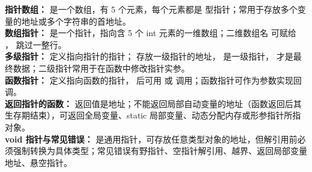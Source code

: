 \documentclass[a4paper,11pt]{article}
\begin{document}

\begin{knowmap}
\textbf{指针数组：} 是一个数组，有 5 个元素，每个元素都是  型指针；常用于存放多个变量的地址或多个字符串的首地址。\\[2pt]
\textbf{数组指针：} 是一个指针，指向含 5 个 int 元素的一维数组；二维数组名  可赋给 ， 跳过一整行。\\[2pt]
\textbf{多级指针：} 定义指向指针的指针； 存放一级指针的地址， 是一级指针， 才是最终数据；二级指针常用于在函数中修改指针实参。\\[2pt]
\textbf{函数指针：} 定义指向函数的指针， 后可用  或  调用；函数指针可作为参数实现回调。\\[2pt]
\textbf{返回指针的函数：} 返回值是地址；不能返回局部自动变量的地址（函数返回后其生存期结束），可返回全局变量、static 局部变量、动态分配内存或形参指针所指对象。\\[2pt]
\textbf{void 指针与常见错误：} 是通用指针，可存放任意类型对象的地址，但解引用前必须强制转换为具体类型；常见错误有野指针、空指针解引用、越界、返回局部变量地址、悬空指针。
\end{knowmap}
\end{document}
